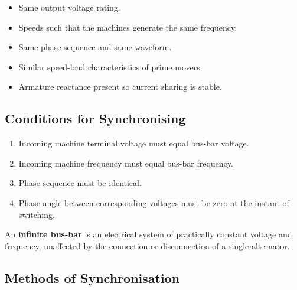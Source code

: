 \documentclass[12pt,a4paper]{article}
\begin{document}
\begin{itemize}[leftmargin=*]
  \item Same output voltage rating.
  \item Speeds such that the machines generate the same frequency.
  \item Same phase sequence and same waveform.
  \item Similar speed-load characteristics of prime movers.
  \item Armature reactance present so current sharing is stable.
\end{itemize}

\subsection{Conditions for Synchronising}

\begin{importantbox}
\begin{enumerate}[leftmargin=*, label=\textcolor{anthBlue}{\HeadingFont\bfseries\arabic*.}]
  \item Incoming machine terminal voltage must equal bus-bar voltage.
  \item Incoming machine frequency must equal bus-bar frequency.
  \item Phase sequence must be identical.
  \item Phase angle between corresponding voltages must be zero at the instant of switching.
\end{enumerate}
\end{importantbox}

\begin{definebox}
An \textbf{infinite bus-bar} is an electrical system of practically constant voltage and frequency, unaffected by the connection or disconnection of a single alternator.
\end{definebox}

\subsection{Methods of Synchronisation}
\end{document}
